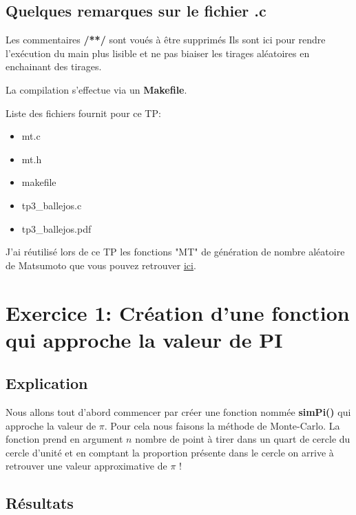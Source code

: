 \documentclass[12pt,french]{article} %
\begin{document}
\subsection*{Quelques remarques sur le fichier .c}

Les commentaires \textbf{/**/} sont voués à être supprimés Ils sont ici pour rendre l'exécution du main plus lisible et ne pas biaiser les tirages aléatoires en enchainant des tirages.

\bigskip

La compilation s'effectue via un \textbf{Makefile}.

\bigskip

Liste des fichiers fournit pour ce TP:
\begin{itemize}
	\item mt.c
	\item mt.h
	\item makefile
	\item tp3\_ballejos.c
	\item tp3\_ballejos.pdf
\end{itemize}

\bigskip

J'ai réutilisé lors de ce TP les fonctions "MT" de génération de nombre aléatoire de Matsumoto que vous pouvez retrouver \href{http://www.math.sci.hiroshima-u.ac.jp/m-mat/eindex.html}{\underline{ici}}.


\newpage

\section{Exercice 1: Création d'une fonction qui approche la valeur de PI}

\subsection{Explication}

Nous allons tout d'abord commencer par créer une fonction nommée \textbf{simPi()} qui approche la valeur de $\pi$. Pour cela nous faisons la méthode de Monte-Carlo. La fonction prend en argument $n$ nombre de point à tirer dans un quart de cercle du cercle d'unité et en comptant la proportion présente dans le cercle on arrive à retrouver une valeur approximative de $\pi$ !

\subsection{Résultats}
\end{document}
